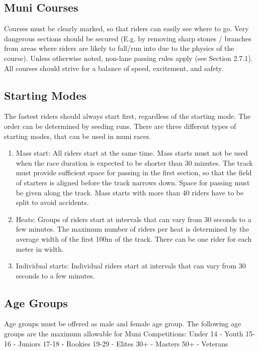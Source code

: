 \subsection{Muni Courses}
Courses must be clearly marked, so that riders can easily see where to go. Very
dangerous sections should be secured (E.g. by removing sharp stones / branches
from areas where riders are likely to fall/run into due to the physics of the
course). Unless otherwise noted, non-lane passing rules apply (see Section
2.7.1). %
All courses should strive for a balance of speed, excitement, and
safety.

\subsection{Starting Modes}
The fastest riders should always start first, regardless of the starting mode.
The order can be determined by seeding runs. There are three different types of
starting modes, that can be used in muni races.

\begin{enumerate}
\item Mass start: All riders start at the same time. Mass starts must not be
      used when the race duration is expected to be shorter than 30 minutes. The
      track must provide sufficient space for passing in the first section, so
      that the field of starters is aligned before the track narrows down. Space
      for passing must be given along the track. Mass starts with more than 40
      riders have to be split to avoid accidents.
\item Heats: Groups of riders start at intervals that can vary from 30 seconds
      to a few minutes. The maximum number of riders per heat is determined by
      the average width of the first 100m of the track. There can be one rider
      for each meter in width.
\item Individual starts: Individual riders start at intervals that can vary from
      30 seconds to a few minutes.
\end{enumerate}

\subsection{Age Groups}
Age groups must be offered as male and female age group.
The following age groups are the maximum allowable for Muni Competitions:
Under 14 - Youth
15-16 - Juniors
17-18 - Rookies
19-29 - Elites
30+ - Masters
50+ - Veterans


